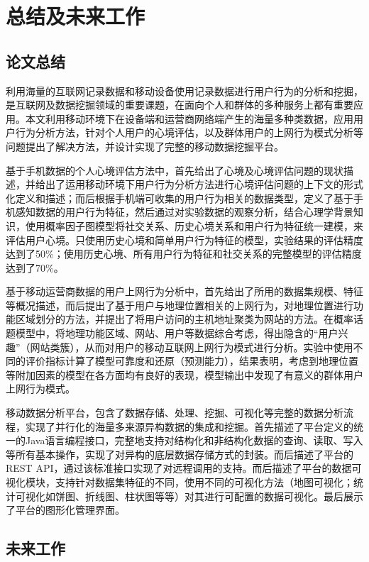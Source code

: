 \chapter{总结及未来工作}
\label{cha:conclusion}

\section{论文总结}
利用海量的互联网记录数据和移动设备使用记录数据进行用户行为的分析和挖掘，是互联网及数据挖掘领域的重要课题，在面向个人和群体的多种服务上都有重要应用。本文利用移动环境下在设备端和运营商网络端产生的海量多种类数据，应用用户行为分析方法，针对个人用户的心境评估，以及群体用户的上网行为模式分析等问题提出了解决方法，并设计实现了完整的移动数据挖掘平台。

基于手机数据的个人心境评估方法中，首先给出了心境及心境评估问题的现状描述，并给出了运用移动环境下用户行为分析方法进行心境评估问题的上下文的形式化定义和描述；而后根据手机端可收集的用户行为相关的数据类型，定义了基于手机感知数据的用户行为特征，然后通过对实验数据的观察分析，结合心理学背景知识，使用概率因子图模型将社交关系、历史心境关系和用户行为特征统一建模，来评估用户心境。只使用历史心境和简单用户行为特征的模型，实验结果的评估精度达到了50\%；使用历史心境、所有用户行为特征和社交关系的完整模型的评估精度达到了70\%。

基于移动运营商数据的用户上网行为分析中，首先给出了所用的数据集规模、特征等概况描述，而后提出了基于用户与地理位置相关的上网行为，对地理位置进行功能区域划分的方法，并提出了将用户访问的主机地址聚类为网站的方法。在概率话题模型中，将地理功能区域、网站、用户等数据综合考虑，得出隐含的``用户兴趣''（网站类簇），从而对用户的移动互联网上网行为模式进行分析。实验中使用不同的评价指标计算了模型可靠度和还原（预测能力），结果表明，考虑到地理位置等附加因素的模型在各方面均有良好的表现，模型输出中发现了有意义的群体用户上网行为模式。

移动数据分析平台，包含了数据存储、处理、挖掘、可视化等完整的数据分析流程，实现了并行化的海量多来源异构数据的集成和挖掘。首先描述了平台定义的统一的Java语言编程接口，完整地支持对结构化和非结构化数据的查询、读取、写入等所有基本操作，实现了对异构的底层数据存储方式的封装。而后描述了平台的REST API，通过该标准接口实现了对远程调用的支持。而后描述了平台的数据可视化模块，支持针对数据集特征的不同，使用不同的可视化方法（地图可视化；统计可视化如饼图、折线图、柱状图等等）对其进行可配置的数据可视化。最后展示了平台的图形化管理界面。

\section{未来工作}

